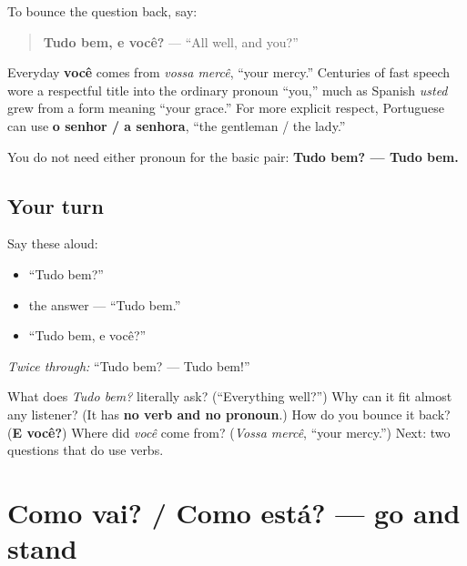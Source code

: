 \begin{grammarlens}[title={Grammar Lens: Add the listener only when useful}]
To bounce the question back, say:

\begin{quote}
\textbf{Tudo bem, e você?} — “All well, and you?”
\end{quote}

Everyday \textbf{você} comes from \emph{vossa mercê}, “your mercy.” Centuries of fast speech wore a respectful title into the ordinary pronoun “you,” much as Spanish \emph{usted} grew from a form meaning “your grace.” For more explicit respect, Portuguese can use \textbf{o senhor / a senhora}, “the gentleman / the lady.”

You do not need either pronoun for the basic pair: \textbf{Tudo bem? — Tudo bem.}
\end{grammarlens}

\subsection*{Your turn}
Say these aloud:

\begin{itemize}
\raggedright
  \item “Tudo bem?”
  \item the answer — “Tudo bem.”
  \item “Tudo bem, e você?”
\end{itemize}

\emph{Twice through:} “Tudo bem? — Tudo bem!”

\begin{tcolorbox}[breakable,colback=teal!4,colframe=teal!35!black,title={Before you move on}]
What does \emph{Tudo bem?} literally ask? (“Everything well?”) Why can it fit almost any listener? (It has \textbf{no verb and no pronoun}.) How do you bounce it back? (\textbf{E você?}) Where did \emph{você} come from? (\emph{Vossa mercê}, “your mercy.”) Next: two questions that do use verbs.
\end{tcolorbox}
\section[Como vai? / Como está?]{Como vai? / Como está? — go and stand}

\label{lesson:PT-C02-como-vai-esta}



